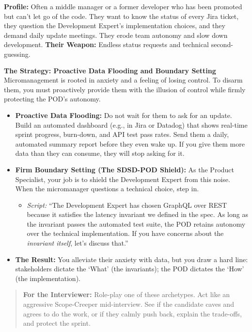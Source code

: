 \textbf{Profile:} Often a middle manager or a former developer who has
been promoted but can't let go of the code. They want to know the status
of every Jira ticket, they question the Development Expert's
implementation choices, and they demand daily update meetings. They
erode team autonomy and slow down development. \textbf{Their Weapon:}
Endless status requests and technical second-guessing.

\textbf{The Strategy: Proactive Data Flooding and Boundary Setting}
Micromanagement is rooted in anxiety and a feeling of losing control. To
disarm them, you must proactively provide them with the illusion of
control while firmly protecting the POD's autonomy.

\begin{itemize}
\tightlist
\item
  \textbf{Proactive Data Flooding:} Do not wait for them to ask for an
  update. Build an automated dashboard (e.g., in Jira or Datadog) that
  shows real-time sprint progress, burn-down, and API test pass rates.
  Send them a daily, automated summary report before they even wake up.
  If you give them more data than they can consume, they will stop
  asking for it.
\item
  \textbf{Firm Boundary Setting (The SDSD-POD Shield):} As the Product
  Specialist, your job is to shield the Development Expert from this
  noise. When the micromanager questions a technical choice, step in.

  \begin{itemize}
  \tightlist
  \item
    \emph{Script:} ``The Development Expert has chosen GraphQL over REST
    because it satisfies the latency invariant we defined in the spec.
    As long as the invariant passes the automated test suite, the POD
    retains autonomy over the technical implementation. If you have
    concerns about the \emph{invariant itself}, let's discuss that.''
  \end{itemize}
\item
  \textbf{The Result:} You alleviate their anxiety with data, but you
  draw a hard line: stakeholders dictate the `What' (the invariants);
  the POD dictates the `How' (the implementation).
\end{itemize}

\begin{quote}
\textbf{For the Interviewer:} Role-play one of these archetypes. Act
like an aggressive Scope-Creeper mid-interview. See if the candidate
caves and agrees to do the work, or if they calmly push back, explain
the trade-offs, and protect the sprint.
\end{quote}

